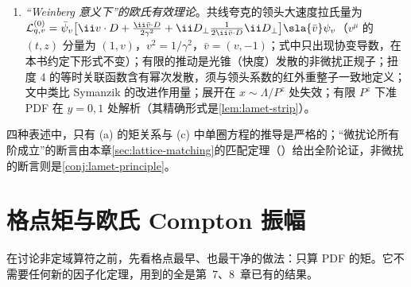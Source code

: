 \begin{remark}
\begin{enumerate}[label=(\alph*),leftmargin=2em,itemsep=2pt,topsep=2pt]
\item \emph{“Weinberg 意义下”的欧氏有效理论}\cite{Ji:2020byp,Ji:2024oka}。共线夸克的领头大速度拉氏量为 $\mathcal L^{(0)}_{q,v}=\bar\psi_v\big[\ii v\cdot D+\frac{\ii\bar v\cdot D}{2\gamma^2}+\ii D_\perp\frac1{2\ii\bar v\cdot D}\ii D_\perp\big]\sla{\bar v}\psi_v$（$v^\mu$ 的 $(t,z)$ 分量为 $(1,v)$，$v^2=1/\gamma^2$，$\bar v=(v,-1)$；式中只出现协变导数，在本书约定下形式不变）；有限的推动是光锥（快度）发散的非微扰正规子；扭度 4 的等时关联函数含有幂次发散，须与领头系数的红外重整子一致地定义；文中类比 Symanzik 的改进作用量；展开在 $x\sim\Lambda/P^z$ 处失效；有限 $P^z$ 下准 PDF 在 $y=0,1$ 处解析（其精确形式是\cref{lem:lamet-strip}）。
\end{enumerate}
四种表述中，只有 (a) 的矩关系与 (c) 中单圈方程的推导是严格的；“微扰论所有阶成立”的断言由本章\cref{sec:lattice-matching}的匹配定理（\tagA）给出全阶论证，非微扰的断言则是\cref{conj:lamet-principle}。
\end{remark}

\section{格点矩与欧氏 Compton 振幅}\label{sec:lattice-moments}

在讨论非定域算符之前，先看格点最早、也最干净的做法：只算 PDF 的矩。它不需要任何新的因子化定理，用到的全是第~7、8~章已有的结果。


